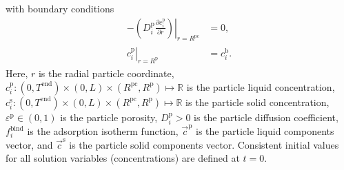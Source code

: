 \documentclass{article}
\begin{document}
with boundary conditions
\begin{align}
- \left. \left( D^{\mathrm{p}}_{i} \frac{\partial c^{\mathrm{p}}_{i}}{\partial r} \right) \right|_{r=R^{\mathrm{pc}}_{}}
&= 0, \\
\left. c^{\mathrm{p}}_{i} \right|_{r = R^{\mathrm{p}}_{}} &= c^{\mathrm{b}}_i.\end{align}
Here, $r$ is the radial particle coordinate, $c^{\mathrm{p}}_{i}\colon  (0, T^\mathrm{end}) \times (0, L)\times (R^{\mathrm{pc}}, R^{\mathrm{p}}) \mapsto \mathbb{R}$ is the particle liquid concentration, $c^{\mathrm{s}}_{i}\colon  (0, T^\mathrm{end}) \times (0, L)\times (R^{\mathrm{pc}}, R^{\mathrm{p}}) \mapsto \mathbb{R}$ is the particle solid concentration, $\varepsilon^{\mathrm{p}}\in (0, 1)$ is the particle porosity, $D^\mathrm{p}_{i}> 0$ is the particle diffusion coefficient, $f^\mathrm{bind}_{i}$ is the adsorption isotherm function, $\vec{c}^\mathrm{p}$ is the particle liquid components vector, and $\vec{c}^\mathrm{s}$ is the particle solid components vector.
Consistent initial values for all solution variables (concentrations) are defined at $t = 0$.
\end{document}
